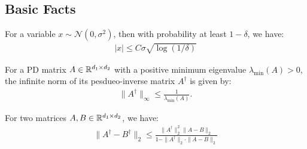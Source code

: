 \subsection{Basic Facts} \label{sec:app:facts}

\begin{fact}\label{fac:gaussian_tail}
    For a variable $x \sim \mathcal{N}(0, \sigma^2)$, then with probability at least $1 - \delta$, we have:
    \begin{align*}
        |x| \leq C \sigma \sqrt{\log(1/\delta)}
    \end{align*}
\end{fact}

\begin{fact}\label{fac:infity_norm_pesdueo_inverse}
    For a PD matrix $A \in \mathbb{R}^{d_1 \times d_2}$ with a positive minimum eigenvalue $\lambda_{\min}(A) > 0$, the infinite norm of its pesdueo-inverse matrix $A^\dag$ is given by:
    \begin{align*}
        \| A^\dagger \|_\infty \leq \frac{1}{\lambda_{\min}(A)}.
    \end{align*}
\end{fact}

\begin{fact}\label{fac:pesdueo_inverse_diff}
    For two matrices $A , B \in\mathbb{R}^{d_1 \times d_2}$, we have:
    \begin{align*}
        \| A^\dagger - B^\dagger \|_2 \leq \frac{\| A^\dagger \|_2^2 \| A - B\|_2 }{1 - \| A^\dagger \|_2 \cdot 
        \| A - B \|_2}
    \end{align*}
\end{fact}